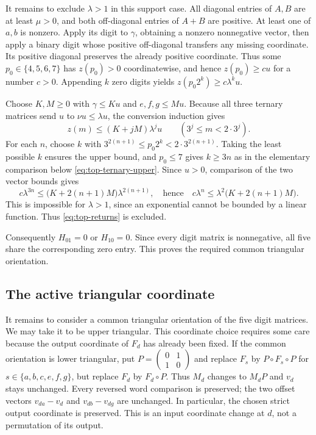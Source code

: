 \documentclass[11pt,a4paper]{article}
\begin{document}
It remains to exclude $\lambda>1$ in this support case.
All diagonal entries of $A,B$ are at least $\mu>0$, and
both off-diagonal entries of $A+B$ are positive.
At least one of $a,b$ is nonzero. Apply its digit to $\gamma$,
obtaining a nonzero nonnegative vector, then apply a binary digit
whose positive off-diagonal transfers any missing coordinate.
Its positive diagonal preserves the already positive coordinate.
Thus some $p_0\in\{4,5,6,7\}$ has $z(p_0)>0$ coordinatewise,
and hence $z(p_0)\ge cu$ for a number $c>0$.
Appending $k$ zero digits yields
$z(p_0 2^k)\ge c\lambda^ku$.

Choose $K,M\ge0$ with $\gamma\le Ku$ and $e,f,g\le Mu$.
Because all three ternary matrices send $u$ to
$\nu u\le\lambda u$, the conversion induction gives
\[
z(m)\le(K+jM)\lambda^ju\qquad(3^j\le m<2\cdot3^j).
\]
For each $n$, choose $k$ with
$3^{2(n+1)}\le p_0 2^k<2\cdot3^{2(n+1)}$.
Taking the least possible $k$ ensures the upper bound, and
$p_0\le7$ gives $k\ge3n$ as in the elementary comparison below
\eqref{eq:top-ternary-upper}. Since $u>0$, comparison of the two
vector bounds gives
\[
c\lambda^{3n}\le\bigl(K+2(n+1)M\bigr)\lambda^{2(n+1)},
\quad\text{hence}\quad
c\lambda^n\le\lambda^2\bigl(K+2(n+1)M\bigr).
\]
This is impossible for $\lambda>1$, since an exponential cannot be
bounded by a linear function. Thus \eqref{eq:top-returns} is excluded.

Consequently $H_{01}=0$ or $H_{10}=0$. Since every digit matrix is
nonnegative, all five share the corresponding zero entry. This proves
the required common triangular orientation.

\subsection{The active triangular coordinate}

It remains to consider a common triangular orientation of the five
digit matrices. We may take it to be upper triangular. This coordinate
choice requires some care because the output coordinate of $F_d$
has already been fixed. If the common orientation is lower triangular,
put $P=\left(\begin{smallmatrix}0&1\\1&0\end{smallmatrix}\right)$
and replace $F_s$ by $P\circ F_s\circ P$ for
$s\in\{a,b,c,e,f,g\}$, but replace $F_d$ by $F_d\circ P$.
Thus $M_d$ changes to $M_dP$ and $v_d$ stays unchanged.
Every reversed word comparison is preserved; the two offset vectors
$v_{da}-v_d$ and $v_{db}-v_{dg}$ are unchanged. In particular, the
chosen strict output coordinate is preserved. This is an input
coordinate change at $d$, not a permutation of its output.
\end{document}
